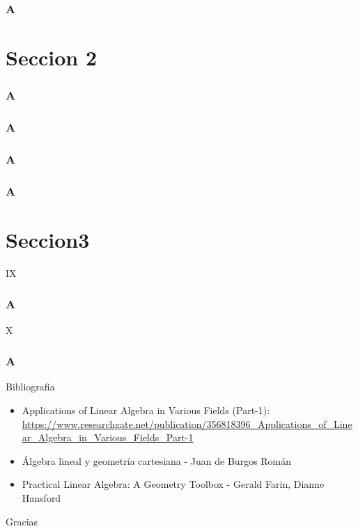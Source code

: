 \documentclass[xcolor={dvipsnames},aspectratio=169,10pt]{beamer}
\begin{document}
\begin{frame}{3}
    \frametitle{A}
    \lipsum[1-1]
\end{frame}

\section{Seccion 2}

\begin{frame}[fragile]{2.1}
    \frametitle{A}
    \lipsum[1-1]
\end{frame}

\begin{frame}[fragile]{2.2}
    \frametitle{A}
    \lipsum[1-1]
\end{frame}


\begin{frame}[fragile]{2.3}
    \frametitle{A}
    \lipsum[1-1]
\end{frame}

\begin{frame}[fragile]{2.4}
    \frametitle{A}
    \lipsum[1-1]
\end{frame}

\section{Seccion3}

\begin{frame}[fragile]{IX}
    \frametitle{A}
    \lipsum[1-1]
\end{frame}

\begin{frame}[fragile]{X}
    \frametitle{A}
    \lipsum[1-1]
\end{frame}

\begin{frame}{Bibliografia}
  \begin{itemize}
    \item Applications of Linear Algebra in Various Fields (Part-1): \url{https://www.researchgate.net/publication/356818396_Applications_of_Linear_Algebra_in_Various_Fields_Part-1}
    \item Álgebra lineal y geometría cartesiana - Juan de Burgos Román
    \item Practical Linear Algebra: A Geometry Toolbox - Gerald Farin, Dianne Hansford
  \end{itemize}
\end{frame}

\begin{frame}[standout]
  Gracias \\
\end{frame}
\end{document}
